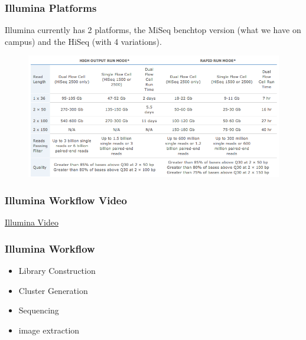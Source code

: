 \documentclass[pdf]{beamer}
\begin{document}
\begin{frame}
  \frametitle{Illumina Platforms}
  Illumina currently has 2 platforms, the MiSeq benchtop version (what we have on campus) and the HiSeq (with 4 variations).
    \begin{center}
    \begin{figure}
    \includegraphics[scale=0.38]{Illumina_specs.png}
  \end{figure}
  \end{center}
\end{frame}

\begin{frame}
  \frametitle{Illumina Workflow Video}
  \begin{center}
  \href{http://www.youtube.com/watch?NR=1&feature=endscreen&v=l99aKKHcxC4}{Illumina Video}
  \end{center}
\end{frame} 

  
\begin{frame}
  \frametitle{Illumina Workflow}
  \begin{itemize}
  \item Library Construction
  \item Cluster Generation
  \item Sequencing
  \item image extraction
  \end{itemize}
\end{frame}
  
\end{document}
